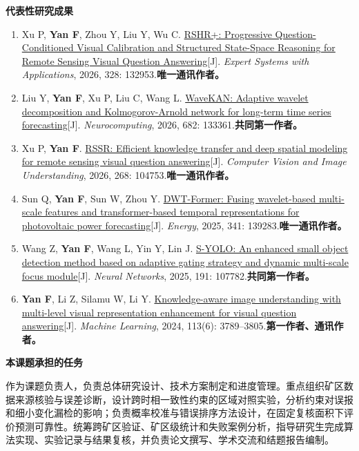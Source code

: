 \noindent\textbf{代表性研究成果}

\begingroup
\fontsize{10.5pt}{16bp}\selectfont\frenchspacing
\begin{enumerate}[label=(\arabic*),leftmargin=2.2em,labelsep=.5em,topsep=5bp,itemsep=6bp,parsep=0pt]
  \item Xu P, \textbf{Yan F}, Zhou Y, Liu Y, Wu C.
  \href{https://doi.org/10.1016/j.eswa.2026.132953}{RSHR+: Progressive Question-Conditioned Visual Calibration and Structured State-Space Reasoning for Remote Sensing Visual Question Answering}[J].
  \textit{Expert Systems with Applications}, 2026, 328: 132953.\quad\textbf{唯一通讯作者。}

  \item Liu Y, \textbf{Yan F}, Xu P, Liu C, Wang L.
  \href{https://doi.org/10.1016/j.neucom.2026.133361}{WaveKAN: Adaptive wavelet decomposition and Kolmogorov-Arnold network for long-term time series forecasting}[J].
  \textit{Neurocomputing}, 2026, 682: 133361.\quad\textbf{共同第一作者。}

  \item Xu P, \textbf{Yan F}.
  \href{https://doi.org/10.1016/j.cviu.2026.104753}{RSSR: Efficient knowledge transfer and deep spatial modeling for remote sensing visual question answering}[J].
  \textit{Computer Vision and Image Understanding}, 2026, 268: 104753.\quad\textbf{唯一通讯作者。}

  \item Sun Q, \textbf{Yan F}, Sun W, Zhou Y.
  \href{https://doi.org/10.1016/j.energy.2025.139283}{DWT-Former: Fusing wavelet-based multi-scale features and transformer-based temporal representations for photovoltaic power forecasting}[J].
  \textit{Energy}, 2025, 341: 139283.\quad\textbf{唯一通讯作者。}

  \item Wang Z, \textbf{Yan F}, Wang L, Yin Y, Lin J.
  \href{https://doi.org/10.1016/j.neunet.2025.107782}{S-YOLO: An enhanced small object detection method based on adaptive gating strategy and dynamic multi-scale focus module}[J].
  \textit{Neural Networks}, 2025, 191: 107782.\quad\textbf{共同第一作者。}

  \item \textbf{Yan F}, Li Z, Silamu W, Li Y.
  \href{https://doi.org/10.1007/s10994-023-06426-6}{Knowledge-aware image understanding with multi-level visual representation enhancement for visual question answering}[J].
  \textit{Machine Learning}, 2024, 113(6): 3789--3805.\quad\textbf{第一作者、通讯作者。}
\end{enumerate}
\endgroup

\noindent\textbf{本课题承担的任务}

作为课题负责人，负责总体研究设计、技术方案制定和进度管理。重点组织矿区数据来源核验与误差诊断，设计跨时相一致性约束的区域对照实验，分析约束对误报和细小变化漏检的影响；负责概率校准与错误排序方法设计，在固定复核面积下评价预测可靠性。统筹跨矿区验证、矿区级统计和失败案例分析，指导研究生完成算法实现、实验记录与结果复核，并负责论文撰写、学术交流和结题报告编制。
